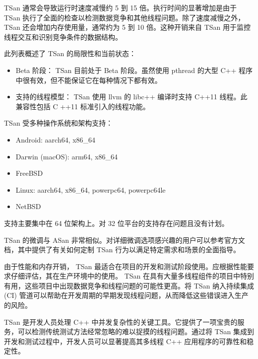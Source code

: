 
TSan 通常会导致运行时速度减慢约 5 到 15 倍。执行时间的显著增加是由于 TSan 执行了全面的检查以检测数据竞争和其他线程问题。除了速度减慢之外， TSan 还会增加内存使用量，通常约为 5 到 10 倍。这种开销来自 TSan 用于监控线程交互和识别竞争条件的数据结构。

此列表概述了 TSan 的局限性和当前状态：

\begin{itemize}
\item
Beta 阶段： TSan 目前处于 Beta 阶段。虽然使用 pthread 的大型 C++ 程序中很有效，但不能保证它在每种情况下都有效。

\item
支持的线程模型： TSan 使用 llvm 的 libc++ 编译时支持 C++11 线程。此兼容性包括 C ++11 标准引入的线程功能。
\end{itemize}

TSan 受多种操作系统和架构支持：

\begin{itemize}
\item
Android: aarch64, x86\_64

\item
Darwin (macOS): arm64, x86\_64

\item
FreeBSD

\item
Linux: aarch64, x86\_64, powerpc64, powerpc64le

\item
NetBSD
\end{itemize}

支持主要集中在 64 位架构上。对 32 位平台的支持存在问题且没有计划。


TSan 的微调与 ASan 非常相似。对详细微调选项感兴趣的用户可以参考官方文档，其中提供了有关如何定制 TSan 行为以满足特定需求和场景的全面指导。


由于性能和内存开销， TSan 最适合在项目的开发和测试阶段使用。应根据性能要求仔细评估，其在生产环境中的使用。 TSan 在具有大量多线程组件的项目中特别有用，这些项目中出现数据竞争和线程问题的可能性更高。将 TSan 纳入持续集成 (CI) 管道可以帮助在开发周期的早期发现线程问题，从而降低这些错误进入生产的风险。

TSan 是开发人员处理 C++ 中并发复杂性的关键工具。它提供了一项宝贵的服务，可以检测传统测试方法经常忽略的难以捉摸的线程问题。通过将 TSan 集成到开发和测试过程中，开发人员可以显著提高其多线程 C++ 应用程序的可靠性和稳定性。

